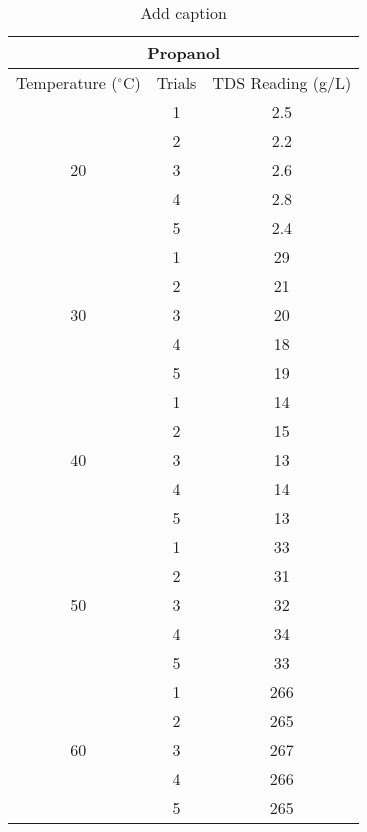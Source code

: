 \newpage

\begin{table}[H]
  \centering
  \caption{Add caption}
    \begin{tabular}{ccc}
    \toprule
    \multicolumn{3}{c}{Propanol} \\
    \midrule
    Temperature ($^\circ$C) & Trials & TDS Reading (g/L)  \\
    \midrule
    \multirow{5}[10]{*}{20} & 1     & 2.5 \\
\cmidrule{2-3}          & 2     & 2.2 \\
\cmidrule{2-3}          & 3     & 2.6 \\
\cmidrule{2-3}          & 4     & 2.8 \\
\cmidrule{2-3}          & 5     & 2.4 \\
    \midrule
    \multirow{5}[10]{*}{30} & 1     & 29 \\
\cmidrule{2-3}          & 2     & 21 \\
\cmidrule{2-3}          & 3     & 20 \\
\cmidrule{2-3}          & 4     & 18 \\
\cmidrule{2-3}          & 5     & 19 \\
    \midrule
    \multirow{5}[10]{*}{40} & 1     & 14 \\
\cmidrule{2-3}          & 2     & 15 \\
\cmidrule{2-3}          & 3     & 13 \\
\cmidrule{2-3}          & 4     & 14 \\
\cmidrule{2-3}          & 5     & 13 \\
    \midrule
    \multirow{5}[10]{*}{50} & 1     & 33 \\
\cmidrule{2-3}          & 2     & 31 \\
\cmidrule{2-3}          & 3     & 32 \\
\cmidrule{2-3}          & 4     & 34 \\
\cmidrule{2-3}          & 5     & 33 \\
    \midrule
    \multirow{5}[10]{*}{60} & 1     & 266 \\
\cmidrule{2-3}          & 2     & 265 \\
\cmidrule{2-3}          & 3     & 267 \\
\cmidrule{2-3}          & 4     & 266 \\
\cmidrule{2-3}          & 5     & 265 \\
    \bottomrule
    \end{tabular}%
  \label{tab:addlabel}%
\end{table}%

